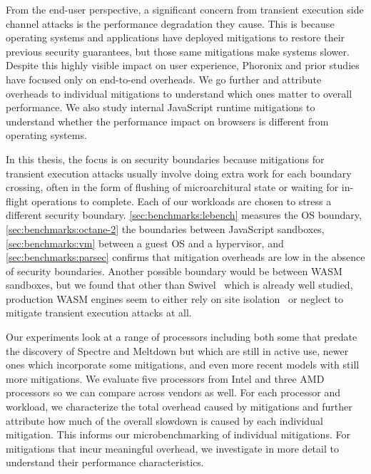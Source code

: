 
From the end-user perspective, a significant concern from transient execution side channel attacks is the performance degradation they cause.
This is because operating systems and applications have deployed mitigations to restore their previous security guarantees, but those same mitigations make systems slower.
Despite this highly visible impact on user experience, Phoronix and prior studies have focused only on end-to-end overheads.
We go further and attribute overheads to individual mitigations to understand which ones matter to overall performance.
We also study internal JavaScript runtime mitigations to understand whether the performance impact on browsers is different from operating systems. 

In this thesis, the focus is on security boundaries because mitigations for transient execution attacks usually involve doing extra work for each boundary crossing, often in the form of flushing of microarchitural state or waiting for in-flight operations to complete.
Each of our workloads are chosen to stress a different security boundary.
\autoref{sec:benchmarks:lebench} measures the OS boundary, \autoref{sec:benchmarks:octane-2} the boundaries between JavaScript sandboxes, \autoref{sec:benchmarks:vm} between a guest OS and a hypervisor, and \autoref{sec:benchmarks:parsec} confirms that mitigation overheads are low in the absence of security boundaries.
Another possible boundary would be between WASM sandboxes, but we found that other than Swivel~\cite{narayan:swivel} which is already well studied, production WASM engines seem to either rely on site isolation~\cite{reis:site-isolation} or neglect to mitigate transient execution attacks at all.

Our experiments look at a range of processors including both some that predate the discovery of Spectre and Meltdown but which are still in active use, newer ones which incorporate some mitigations, and even more recent models with still more mitigations.
We evaluate five processors from Intel and three AMD processors so we can compare across vendors as well.
For each processor and workload, we characterize the total overhead caused by mitigations and further attribute how much of the overall slowdown is caused by each individual mitigation.
This informs our microbenchmarking of individual mitigations.
For mitigations that incur meaningful overhead, we investigate in more detail to understand their performance characteristics.

